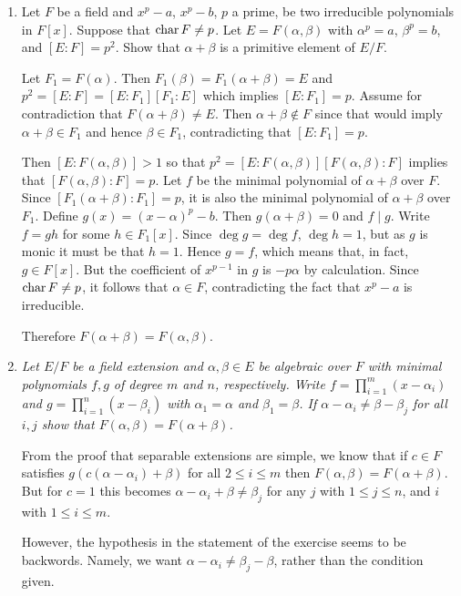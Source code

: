 \documentclass[10pt]{article}
\begin{document}
\begin{enumerate}
\item{Let $F$ be a field and $x^p - a$, $x^p - b$, $p$ a prime, be two irreducible polynomials in $F[x]$.  Suppose that $\operatorname{char} F \neq p$.  Let $E = F(\alpha, \beta)$ with $\alpha^p = a$, $\beta^p = b$, and $[E:F] = p^2$.  Show that $\alpha + \beta$ is a primitive element of $E/F$.}

Let $F_1 = F(\alpha)$.  Then $F_1(\beta) = F_1(\alpha+\beta) = E$ and $p^2 = [E:F] = [E:F_1][F_1:E]$ which implies $[E:F_1] = p$.  Assume for contradiction that $F(\alpha + \beta) \neq E$.  Then $\alpha + \beta \notin F$ since that would imply $\alpha + \beta \in F_1$ and hence $\beta \in F_1$, contradicting that $[E:F_1] = p$.

Then $[E:F(\alpha,\beta)] > 1$ so that $p^2 = [E:F(\alpha,\beta)][F(\alpha,\beta):F]$ implies that $[F(\alpha,\beta):F] = p$.  Let $f$ be the minimal polynomial of $\alpha + \beta$ over $F$.  Since $[F_1(\alpha+\beta):F_1] = p$, it is also the minimal polynomial of $\alpha + \beta$ over $F_1$.  Define $g(x) = (x-\alpha)^p - b$.  Then $g(\alpha+\beta) = 0$ and $f \mid g$.  Write $f = gh$ for some $h \in F_1[x]$.  Since $\deg g = \deg f$, $\deg h = 1$, but as $g$ is monic it must be that $h = 1$.  Hence $g = f$, which means that, in fact, $g \in F[x]$.  But the coefficient of $x^{p-1}$ in $g$ is $-p\alpha$ by calculation.  Since $\operatorname{char} F \neq p$, it follows that $\alpha \in F$, contradicting the fact that $x^p - a$ is irreducible.

Therefore $F(\alpha+\beta) = F(\alpha, \beta)$.

\item \emph{Let $E/F$ be a field extension and $\alpha, \beta \in E$ be algebraic over $F$ with minimal polynomials $f,g$ of degree $m$ and $n$, respectively.  Write $f = \prod_{i=1}^m(x - \alpha_i)$ and $g = \prod_{i=1}^n(x - \beta_i)$ with $\alpha_1 = \alpha$ and $\beta_1 = \beta$.  If $\alpha - \alpha_i \neq \beta - \beta_j$ for all $i,j$ show that $F(\alpha, \beta) = F(\alpha+\beta)$.}

From the proof that separable extensions are simple, we know that if $c \in F$ satisfies $g(c(\alpha-\alpha_i) + \beta)$ for all $2 \leq i \leq m$ then $F(\alpha, \beta) = F(\alpha + \beta)$.  But for $c = 1$ this becomes $\alpha-\alpha_i + \beta \neq \beta_j$ for any $j$ with $1 \leq j \leq n$, and $i$ with $1 \leq i \leq m$.

However, the hypothesis in the statement of the exercise seems to be backwords.  Namely, we want $\alpha - \alpha_i \neq \beta_j - \beta$, rather than the condition given.


\end{enumerate}
\end{document}
